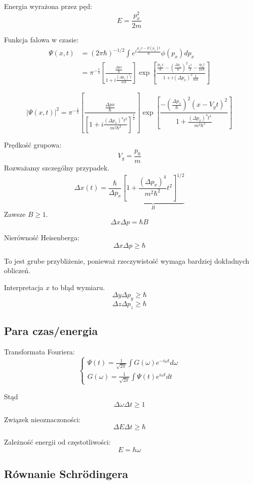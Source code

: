 Energia wyrażona przez pęd:
\[
E = \frac{p_x^2}{2m}
\]

Funkcja falowa w czasie:
\begin{align*}
\Psi(x,t) &= \left(2\pi\hbar \right)^{-1/2} \int e^{i\frac{p_x x - E(p_x)t}{\hbar}} \phi(p_x) dp_x \\
&= \pi^{-\frac{1}{4}}\left[\frac{\frac{\Delta p x}{\hbar}}{1+i\frac{(\Delta p_x)^2 t}{m\hbar}}\right] \exp\left[\frac{\frac{ip_0 x}{\hbar}-\left(\frac{\Delta p_x}{\hbar}\right)^2\frac{x^2}{2}-\frac{ip_0 t}{2x\hbar}}{1+i(\Delta p_x)^2 \frac{t}{m\hbar}}\right]
\end{align*}

\[
|\Psi(x,t)|^2 = \pi^{-\frac{1}{2}}\left[\frac{\frac{\Delta p x}{\hbar}}{\left[1+i\frac{(\Delta p_x)^4 t^2}{m^2\hbar^2}\right]^{\frac{1}{2}}}\right] \exp\left[\frac{-\left(\frac{\Delta p_x}{\hbar}\right)^2(x-V_gt)^2}{1+\frac{(\Delta p_x)^4 t^4}{m^2\hbar^2}}\right]
\]

Prędkość grupowa:
\[
V_g = \frac{p_0}{m}
\]
Rozważamy szczególny przypadek.
\[
\Delta x (t) = \frac{\hbar}{\Delta p_x} \underbrace{\left[1 + \frac{(\Delta p_x)^4}{m^2\hbar^2}t^2\right]^{1/2}}_{B}
\]
Zawsze $B \geq 1$.
\[
\Delta x \Delta p = \hbar B
\]

Nierówność Heisenberga:
\[
\Delta x \Delta p \geq \hbar
\]

To jest grube przybliżenie, ponieważ rzeczywistość wymaga bardziej dokładnych obliczeń.

Interpretacja $x$ to błąd wymiaru.
\[
\Delta y \Delta p_y \geq \hbar
\]
\[
\Delta z \Delta p_z \geq \hbar
\]

\subsection{Para czas/energia}
Transformata Fouriera:
\[
\begin{cases}
\Psi(t) = \frac{1}{\sqrt{2\pi}} \int G(\omega) e^{-i\omega t} d\omega\\
G(\omega) = \frac{1}{\sqrt{2\pi}} \int \Psi(t) e^{i\omega t} dt
\end{cases}
\]

Stąd
\[
\Delta \omega \Delta t \geq 1
\]

Związek nieoznaczoności:
\[
\Delta E \Delta t \geq \hbar
\]

Zależność energii od częstotliwości:
\[
E = \hbar \omega
\]

\subsection{Równanie Schrödingera}

